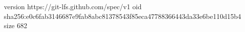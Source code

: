 version https://git-lfs.github.com/spec/v1
oid sha256:e0c6fab3146687e9fab8abc81378543f85eca47788366443da33e6be110d15b4
size 682
